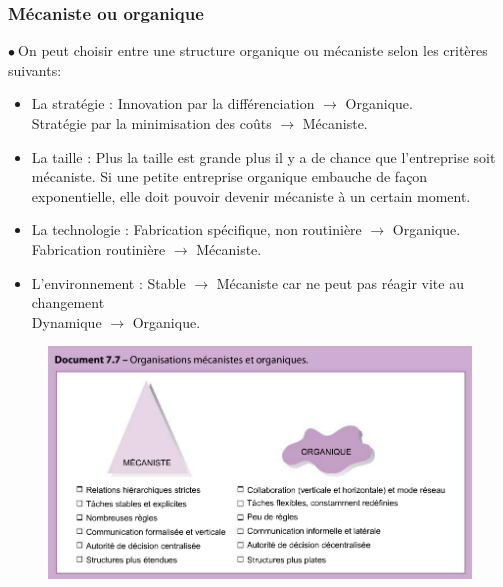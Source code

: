 \documentclass[letterpaper, 12pt]{article}
\newcommand{\point}{$\bullet\ $}
\begin{document}
		\subsubsection{Mécaniste ou organique}
			\point On peut choisir entre une structure organique ou mécaniste selon les critères suivants:
				\begin{itemize}
					\setlength{\itemsep}{0pt}
			    	\setlength{\parskip}{0pt}
			    	\setlength{\parsep}{0pt}
			    	\item La stratégie : Innovation par la différenciation $\rightarrow$ Organique.\\
			    		Stratégie par la minimisation des coûts $\rightarrow$ Mécaniste.
			    	\item La taille : Plus la taille est grande plus il y a de chance que l'entreprise soit 
			    		mécaniste. Si une petite entreprise organique embauche de façon exponentielle,
			    		elle doit pouvoir devenir mécaniste à un certain moment.
			    	\item La technologie : Fabrication spécifique, non routinière $\rightarrow$ Organique.\\
			    		Fabrication routinière $\rightarrow$ Mécaniste.
			    	\item L'environnement : Stable $\rightarrow$ Mécaniste car ne peut pas réagir vite au
			    		changement\\Dynamique $\rightarrow$ Organique.
				\end{itemize}
			\begin{figure}[H]
				\centering
				\includegraphics[scale=0.75]{Images/structure}
			\end{figure}
\end{document}
